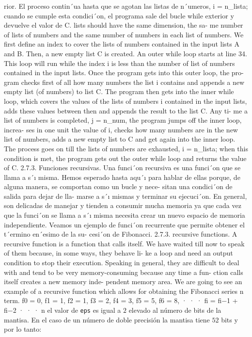 \begin{paracol}{2}
{rior. El proceso contin´ua hasta que se agotan
las listas de n´umeros, i = n_lista; cuando
se cumple esta condici´on, el programa sale del
bucle while exterior y devuelve el valor de C.
lists should have the same dimension, the sa-
me number of lists of numbers and the same
number of numbers in each list of numbers.
We first define an index to cover the lists of
numbers contained in the input lists A and B.
Then, a new empty list C is created. An outer
while loop starts at line 34. This loop will run
while the index i is less than the number of list
of numbers contained in the input lists. Once
the program gets into this outer loop, the pro-
gram checks first of all how many numbers the
list i contains and appends a new empty list
(of numbers) to list C. The program then gets
into the inner while loop, which covers the
values of the lists of numbers i contained in
the input lists, adds these values between then
and appends the result to the list C. Any ti-
me a list of numbers is completed, j = n_num,
the program jumps off the inner loop, increa-
ses in one unit the value of i, checks how many
numbers are in the new list of numbers, adds
a new empty list to C and get again into the
inner loop. The process goes on till the lists of
numbers are exhausted, i = n_lista; when
this condition is met, the program gets out
the outer while loop and returns the value of
C.
2.7.3. Funciones recursivas.
Una funci´on recursiva es una funci´on que
se llama a s´ı misma. Hemos esperado hasta
aqu´ı para hablar de ellas porque, de alguna
manera, se comportan como un bucle y nece-
sitan una condici´on de salida para dejar de lla-
marse a s´ı mismas y terminar su ejecuci´on. En
general, son delicadas de manejar y tienden a
consumir mucha memoria ya que cada vez que
la funci´on se llama a s´ı misma necesita crear
un nuevo espacio de memoria independiente.
Veamos un ejemplo de funci´on recurrente que
permite obtener el t´ermino en´esimo de la su-
cesi´on de Fibonacci.
2.7.3. recursive functions.
A recursive function is a function that calls
itself. We have waited till now to speak of
them because, in some ways, they behave li-
ke a loop and need an output condition to
stop their execution. Speaking in general, they
are difficult to deal with and tend to be very
memory-consuming because any time a fun-
ction calls itself creates a new memory inde-
pendent memory area. We are going to see an
example of a recursive function which allows
for obtaining the Fibonacci series n term.
f0 = 0, f1 = 1, f2 = 1, f3 = 2, f4 = 3, f5 = 5, f6 = 8, · · · fi = fi−1 + fi−2 · · ·
n} el valor de \texttt{eps} es igual a $2$ elevado al número de bits de la mantisa. En el caso de un número de doble precisión la mantisa tiene $52$ bits y por lo tanto:


\end{paracol}
